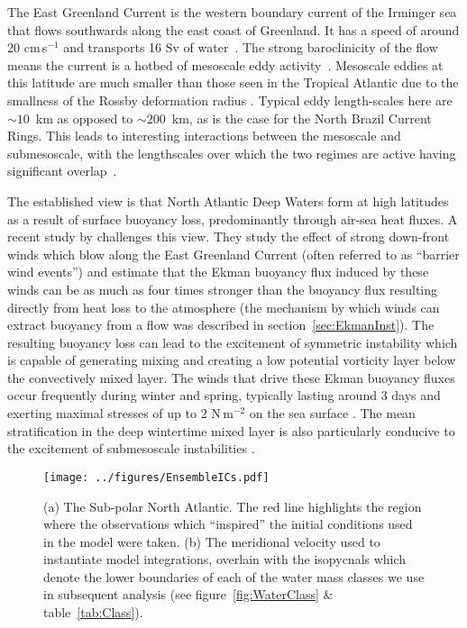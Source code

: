 The East Greenland Current is the western boundary current of the Irminger sea that flows southwards along the east coast of Greenland. It has a speed of around 20 cm\,s$^{-1}$ and transports 16 Sv of water~\citep{Talley2011ArcOce, Talley2011AtlOce}. The strong baroclinicity of the flow means the current is a hotbed of mesoscale eddy activity~\citep{Foldvik1988}. Mesoscale eddies at this latitude are much smaller than those seen in the Tropical Atlantic due to the smallness of the Rossby deformation radius \citep{Chelton1998}. Typical eddy length-scales here are $\sim 10$~km as opposed to $\sim 200$~km, as is the case for the North Brazil Current Rings. This leads to interesting interactions between the mesoscale and submesoscale, with the lengthscales over which the two regimes are active having significant overlap~\citep{Gula2022}.

The established view is that North Atlantic Deep Waters form at high latitudes as a result of surface buoyancy loss, predominantly through air-sea heat fluxes. A recent study by \citet{LeBras2022} challenges this view. They study the effect of strong down-front winds which blow along the East Greenland Current (often referred to as ``barrier wind events'') and estimate that the Ekman buoyancy flux induced by these winds can be as much as four times stronger than the buoyancy flux resulting directly from heat loss to the atmosphere (the mechanism by which winds can extract buoyancy from a flow was described in section~\ref{sec:EkmanInst}). The resulting buoyancy loss can lead to the excitement of symmetric instability which is capable of generating mixing and creating a low potential vorticity layer below the convectively mixed layer. The winds that drive these Ekman buoyancy fluxes occur frequently during winter and spring, typically lasting around 3 days and exerting maximal stresses of up to 2 N\,m$^{-2}$ on the sea surface \citep{LeBras2022}. The mean stratification in the deep wintertime mixed layer is also particularly conducive to the excitement of submesoscale instabilities \citep{Brannigan2015}.

\begin{figure}[t]
    \centering
    \texttt{[image: ../figures/EnsembleICs.pdf]}
    \caption{(a) The Sub-polar North Atlantic. The red line highlights the region where the observations which ``inspired'' the initial conditions used in the model were taken. (b) The meridional velocity used to instantiate model integrations, overlain with the isopycnals which denote the lower boundaries of each of the water mass classes we use in subsequent analysis (see figure~\ref{fig:WaterClass} \& table~\ref{tab:Class}).}
    \label{fig:EnsembleICs}
\end{figure}

